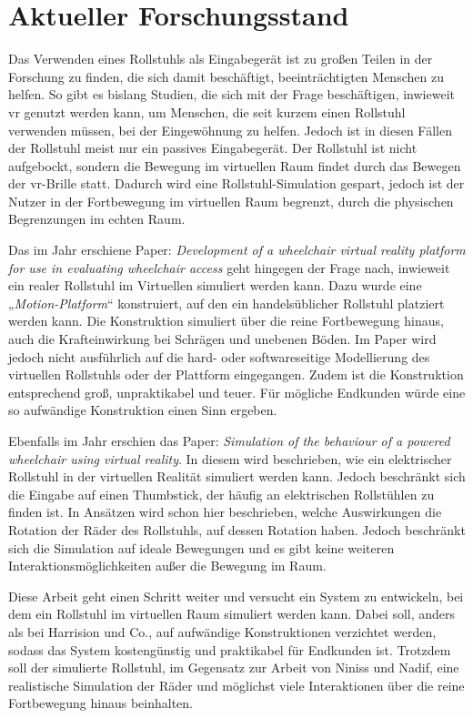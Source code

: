 \chapter{Aktueller Forschungsstand}
Das Verwenden eines Rollstuhls als Eingabegerät ist zu großen Teilen in der Forschung zu finden, die sich damit beschäftigt, beeinträchtigten Menschen zu helfen.
So gibt es bislang Studien, die sich mit der Frage beschäftigen, inwieweit \ac{vr} genutzt werden kann, um Menschen, die seit kurzem einen Rollstuhl verwenden müssen, bei der Eingewöhnung zu helfen\cite{arlatiVirtualRealitybasedWheelchair2020}.
Jedoch ist in diesen Fällen der Rollstuhl meist nur ein passives Eingabegerät.
Der Rollstuhl ist nicht aufgebockt, sondern die Bewegung im virtuellen Raum findet durch das Bewegen der \ac{vr}-Brille statt.
Dadurch wird eine Rollstuhl-Simulation gespart, jedoch ist der Nutzer in der Fortbewegung im virtuellen Raum begrenzt, durch die physischen Begrenzungen im echten Raum.

Das im Jahr \citeyear{harrisionDevelopmentWheelchairVirtual2000} erschiene Paper: \textit{Development of a wheelchair virtual reality platform for use in evaluating wheelchair access} geht hingegen der Frage nach, inwieweit ein realer Rollstuhl im Virtuellen simuliert werden kann\cite{harrisionDevelopmentWheelchairVirtual2000}.
Dazu wurde eine „\textit{Motion-Platform}“ konstruiert, auf den ein handelsüblicher Rollstuhl platziert werden kann.
Die Konstruktion simuliert über die reine Fortbewegung hinaus, auch die Krafteinwirkung bei Schrägen und unebenen Böden.
Im Paper wird jedoch nicht ausführlich auf die hard- oder softwareseitige Modellierung des virtuellen Rollstuhls oder der Plattform eingegangen.
Zudem ist die Konstruktion entsprechend groß, unpraktikabel und teuer.
Für mögliche Endkunden würde eine so aufwändige Konstruktion einen Sinn ergeben.

Ebenfalls im Jahr \citeyear{ninissSimulationBehaviourPowered2000} erschien das Paper: \textit{Simulation of the behaviour of a powered wheelchair using virtual reality}\cite{ninissSimulationBehaviourPowered2000}.
In diesem wird beschrieben, wie ein elektrischer Rollstuhl in der virtuellen Realität simuliert werden kann.
Jedoch beschränkt sich die Eingabe auf einen Thumbstick, der häufig an elektrischen Rollstühlen zu finden ist.
In Ansätzen wird schon hier beschrieben, welche Auswirkungen die Rotation der Räder des Rollstuhls, auf dessen Rotation haben.
Jedoch beschränkt sich die Simulation auf ideale Bewegungen und es gibt keine weiteren Interaktionsmöglichkeiten außer die Bewegung im Raum.

Diese Arbeit geht einen Schritt weiter und versucht ein System zu entwickeln, bei dem ein Rollstuhl im virtuellen Raum simuliert werden kann.
Dabei soll, anders als bei Harrision und Co., auf aufwändige Konstruktionen verzichtet werden, sodass das System kostengünstig und praktikabel für Endkunden ist.
Trotzdem soll der simulierte Rollstuhl, im Gegensatz zur Arbeit von Niniss und Nadif, eine realistische Simulation der Räder und möglichst viele Interaktionen über die reine Fortbewegung hinaus beinhalten.
